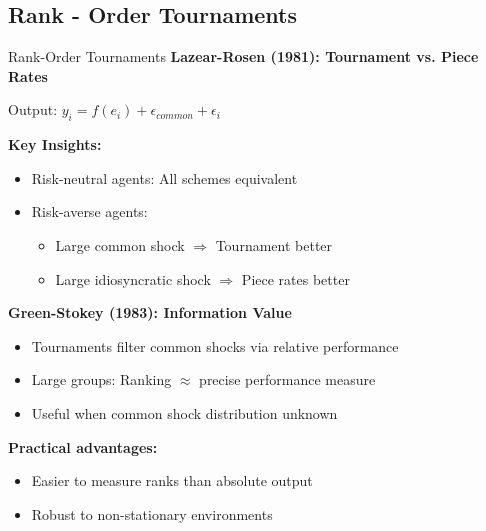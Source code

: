 \documentclass[xcolor={x11names}]{beamer}
\begin{document}
\subsection{Rank - Order Tournaments}

\begin{frame}{Rank-Order Tournaments}
\textbf{Lazear-Rosen (1981): Tournament vs. Piece Rates}

Output: $y_i = f(e_i) + \epsilon_{common} + \epsilon_i$

\textbf{Key Insights:}
\begin{itemize}
\item Risk-neutral agents: All schemes equivalent
\item Risk-averse agents:
  \begin{itemize}
  \item Large common shock $\Rightarrow$ Tournament better
  \item Large idiosyncratic shock $\Rightarrow$ Piece rates better
  \end{itemize}
\end{itemize}

\textbf{Green-Stokey (1983): Information Value}
\begin{itemize}
\item Tournaments filter common shocks via relative performance
\item Large groups: Ranking $\approx$ precise performance measure
\item Useful when common shock distribution unknown
\end{itemize}

\textbf{Practical advantages:}
\begin{itemize}
\item Easier to measure ranks than absolute output
\item Robust to non-stationary environments
\end{itemize}
\end{frame}
\end{document}
